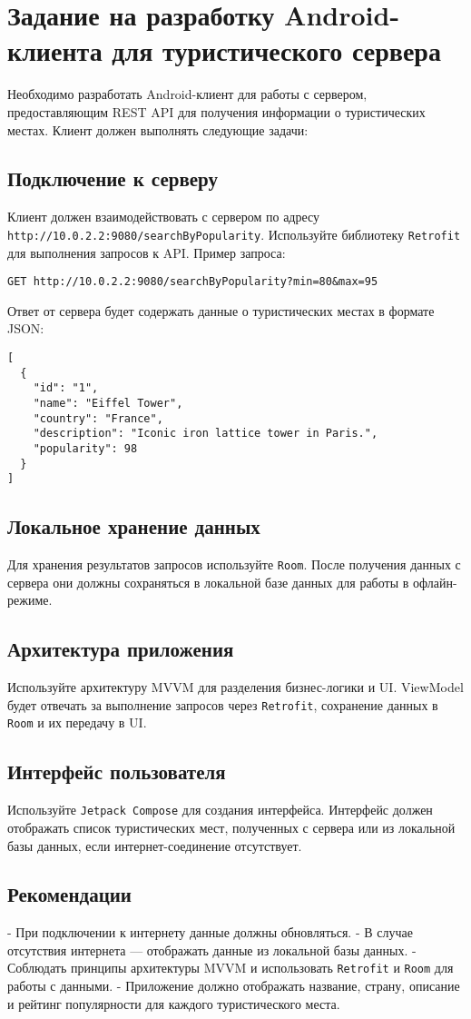 \section{Задание на разработку Android-клиента для туристического сервера}

Необходимо разработать Android-клиент для работы с сервером, предоставляющим REST API для получения информации о туристических местах. Клиент должен выполнять следующие задачи:

\subsection{Подключение к серверу}
Клиент должен взаимодействовать с сервером по адресу \texttt{http://10.0.2.2:9080/searchByPopularity}. Используйте библиотеку \texttt{Retrofit} для выполнения запросов к API. Пример запроса:

\begin{verbatim}
GET http://10.0.2.2:9080/searchByPopularity?min=80&max=95
\end{verbatim}

Ответ от сервера будет содержать данные о туристических местах в формате JSON:

\begin{verbatim}
[
  {
    "id": "1",
    "name": "Eiffel Tower",
    "country": "France",
    "description": "Iconic iron lattice tower in Paris.",
    "popularity": 98
  }
]
\end{verbatim}

\subsection{Локальное хранение данных}
Для хранения результатов запросов используйте \texttt{Room}. После получения данных с сервера они должны сохраняться в локальной базе данных для работы в офлайн-режиме.

\subsection{Архитектура приложения}
Используйте архитектуру MVVM для разделения бизнес-логики и UI. ViewModel будет отвечать за выполнение запросов через \texttt{Retrofit}, сохранение данных в \texttt{Room} и их передачу в UI.

\subsection{Интерфейс пользователя}
Используйте \texttt{Jetpack Compose} для создания интерфейса. Интерфейс должен отображать список туристических мест, полученных с сервера или из локальной базы данных, если интернет-соединение отсутствует.

\subsection{Рекомендации}
- При подключении к интернету данные должны обновляться.
- В случае отсутствия интернета — отображать данные из локальной базы данных.
- Соблюдать принципы архитектуры MVVM и использовать \texttt{Retrofit} и \texttt{Room} для работы с данными.
- Приложение должно отображать название, страну, описание и рейтинг популярности для каждого туристического места.

